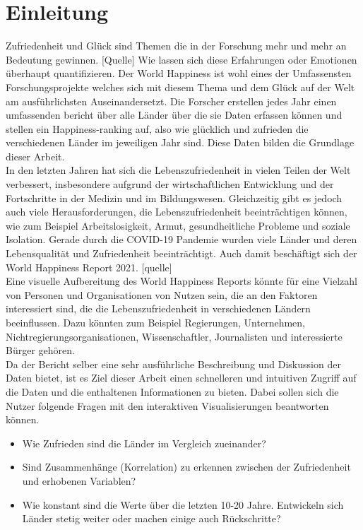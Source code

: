 \section{Einleitung}

Zufriedenheit und Glück sind Themen die in der Forschung mehr und mehr an Bedeutung gewinnen. [Quelle]
Wie lassen sich diese Erfahrungen oder Emotionen überhaupt quantifizieren. Der World Happiness ist wohl eines der Umfassensten Forschungsprojekte welches sich mit diesem Thema und dem Glück auf der Welt am ausführlichsten Auseinandersetzt. Die Forscher erstellen jedes Jahr einen umfassenden bericht über alle Länder über die sie Daten erfassen können und stellen ein Happiness-ranking auf, also wie glücklich und zufrieden die verschiedenen Länder im jeweiligen Jahr sind. Diese Daten bilden die Grundlage dieser Arbeit. \\

In den letzten Jahren hat sich die Lebenszufriedenheit in vielen Teilen der Welt verbessert, insbesondere aufgrund der wirtschaftlichen Entwicklung und der Fortschritte in der Medizin und im Bildungswesen. Gleichzeitig gibt es jedoch auch viele Herausforderungen, die Lebenszufriedenheit beeinträchtigen können, wie zum Beispiel Arbeitslosigkeit, Armut, gesundheitliche Probleme und soziale Isolation. Gerade durch die COVID-19 Pandemie wurden viele Länder und deren Lebensqualität und Zufriedenheit beeinträchtigt. Auch damit beschäftigt sich der World Happiness Report 2021.  [quelle] \\

Eine visuelle Aufbereitung des World Happiness Reports könnte für eine Vielzahl von Personen und Organisationen von Nutzen sein, die an den Faktoren interessiert sind, die die Lebenszufriedenheit in verschiedenen Ländern beeinflussen. Dazu könnten zum Beispiel Regierungen, Unternehmen, Nichtregierungsorganisationen, Wissenschaftler, Journalisten und interessierte Bürger gehören. \\

Da der Bericht selber eine sehr ausführliche Beschreibung und Diskussion der Daten bietet, ist es Ziel dieser Arbeit einen schnelleren und intuitiven Zugriff auf die Daten und die enthaltenen Informationen zu bieten. Dabei sollen sich die Nutzer folgende Fragen mit den interaktiven Visualisierungen beantworten können. \\

\begin{itemize}
    \item Wie Zufrieden sind die Länder im Vergleich zueinander?
    \item Sind Zusammenhänge (Korrelation) zu erkennen zwischen der Zufriedenheit und erhobenen Variablen?
    \item Wie konstant sind die Werte über die letzten 10-20 Jahre. Entwickeln sich Länder stetig weiter oder machen einige auch Rückschritte?
\end{itemize}

